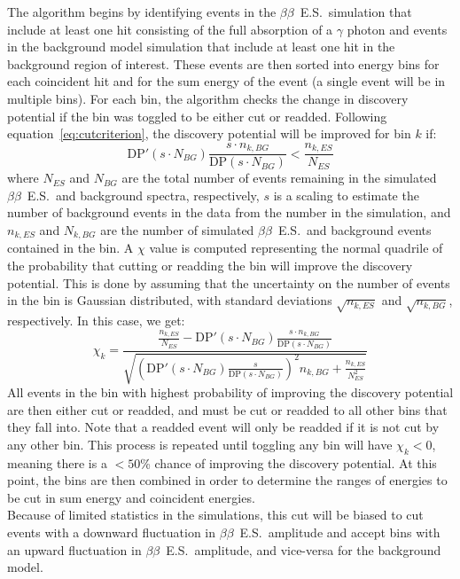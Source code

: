 \documentclass[notitlepage,rmp,aps,10pt]{revtex4-1}
\newcommand{\bb}{${\beta \beta}$}
\newcommand{\bbes}{\bb~E.S.}
\begin{document}
The algorithm begins by identifying events in the \bbes\ simulation that include at least one hit consisting of the full absorption of a $\gamma$ photon and events in the background model simulation that include at least one hit in the background region of interest.
These events are then sorted into energy bins for each coincident hit and for the sum energy of the event (a single event will be in multiple bins).
For each bin, the algorithm checks the change in discovery potential if the bin was toggled to be either cut or readded.
Following equation~\ref{eq:cutcriterion}, the discovery potential will be improved for bin $k$ if:
\begin{equation}
  \mathrm{DP}'(s\cdot N_{BG})\frac{s\cdot n_{k,BG}}{\mathrm{DP}(s\cdot N_{BG})} < \frac{n_{k,ES}}{N_{ES}}
\end{equation}
where $N_{ES}$ and $N_{BG}$ are the total number of events remaining in the simulated \bbes\ and background spectra, respectively, $s$ is a scaling to estimate the number of background events in the data from the number in the simulation, and $n_{k,ES}$ and $N_{k,BG}$ are the number of simulated \bbes\ and background events contained in the bin.
A $\chi$ value is computed representing the normal quadrile of the probability that cutting or readding the bin will improve the discovery potential.
This is done by assuming that the uncertainty on the number of events in the bin is Gaussian distributed, with standard deviations $\sqrt{n_{k,ES}}$ and $\sqrt{n_{k,BG}}$, respectively.
In this case, we get:
\begin{equation}
  \chi_k = \frac{ \frac{n_{k,ES}}{N_{ES}} - \mathrm{DP}'(s\cdot N_{BG})\frac{s\cdot n_{k,BG}}{\mathrm{DP}(s\cdot N_{BG})} }{ \sqrt{ (\mathrm{DP}'(s\cdot N_{BG})\frac{s}{\mathrm{DP}(s\cdot N_{BG})})^2n_{k,BG} + \frac{n_{k,ES}}{N_{ES}^2} } }
\end{equation}
All events in the bin with highest probability of improving the discovery potential are then either cut or readded, and must be cut or readded to all other bins that they fall into.
Note that a readded event will only be readded if it is not cut by any other bin.
This process is repeated until toggling any bin will have $\chi_k<0$, meaning there is a $<50$\% chance of improving the discovery potential.
At this point, the bins are then combined in order to determine the ranges of energies to be cut in sum energy and coincident energies.
\\
Because of limited statistics in the simulations, this cut will be biased to cut events with a downward fluctuation in \bbes\ amplitude and accept bins with an upward fluctuation in \bbes\ amplitude, and vice-versa for the background model.
\end{document}
